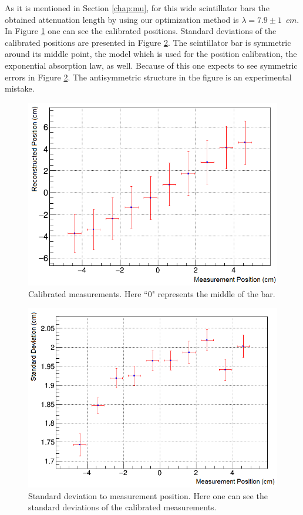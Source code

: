 \documentclass[a4paper]{article}\linespread{1.4}
\begin{document}
As it is mentioned in Section \ref{chap:mu}, for this wide scintillator bars the obtained attenuation length by using our optimization method is $\lambda=7.9\pm1$~$cm$. In Figure \ref{fig:pro1} one can see the calibrated positions. 
Standard deviations of the calibrated positions are presented in Figure \ref{fig:pro2}. 
The scintillator bar is symmetric around its middle point, the model which is used for the position calibration, the exponential absorption law, as well. Because of this one expects to see symmetric errors in Figure \ref{fig:pro2}. The antisymmetric structure in the figure is an experimental mistake.
\begin{figure}[] \hspace*{-0cm} \includegraphics[width=120mm,scale=2.0]{figures/pro1.png} \caption{Calibrated measurements. Here ``0" represents the middle of the bar.}  \label{fig:pro1}\end{figure}
\begin{figure}[] \hspace*{-0cm} \includegraphics[width=120mm,scale=2.0]{figures/pro2.png} \caption{Standard deviation to measurement position. Here one can see the standard deviations of the calibrated measurements.}  \label{fig:pro2}\end{figure}
\end{document}

